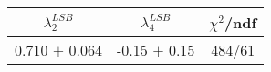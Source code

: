 \begin{tabular}{c|c||c}
$\lambda_{2}^{LSB}$ & $\lambda_4^{LSB}$ & $\chi^{2}$/ndf \\
\hline
0.710 $\pm$ 0.064 & -0.15 $\pm$ 0.15 & 484/61\\
\end{tabular}
